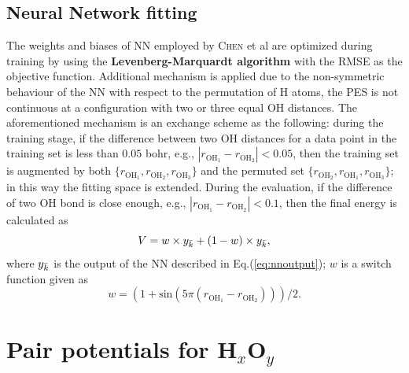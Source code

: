\documentclass[12pt]{article}
\begin{document}
\subsection{Neural Network fitting}
The weights and biases of NN employed by \textsc{Chen} et al \cite{idx60} are optimized during training by using the \textbf{Levenberg-Marquardt algorithm} \cite{lmalgo} with the RMSE as the objective function.
Additional mechanism is applied due to the non-symmetric behaviour of the NN with respect to the permutation of H atoms, the PES is not continuous at a configuration with two or three equal OH distances. The aforementioned mechanism is an exchange scheme as the following: during the training stage, if the difference between two OH distances for a data point in the training set is less than $0.05$ bohr, e.g., $|r_{\text{OH}_1} - r_{\text{OH}_2}| < 0.05$, then the training set is augmented by both $\{r_{\text{OH}_1}, r_{\text{OH}_2}, r_{\text{OH}_3}\}$ and the permuted set $\{r_{\text{OH}_2}, r_{\text{OH}_1}, r_{\text{OH}_3}\}$; in this way the fitting space is extended. During the evaluation, if the difference of two OH bond is close enough, e.g., $|r_{\text{OH}_1} - r_{\text{OH}_2}| < 0.1$, then the final energy is calculated as
\begin{equation}
    V = w \times y_{\Bar{k}} + (1-w) \times y_{\Bar{k}},
    \label{eq:nnfinalenergy}
\end{equation}
where $y_{\Bar{k}}$ is the output of the NN described in Eq.(\ref{eq:nnoutput}); $w$ is a switch function given as
\begin{equation}
    w = (1+\text{sin}\left(5\pi(r_{\text{OH}_1} - r_{\text{OH}_2})\right))/2.
\end{equation}

\section{Pair potentials for H$_x$O$_y$}
\label{section:pairpot}
\end{document}
